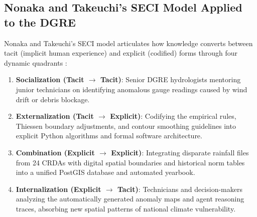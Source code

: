 \documentclass[12pt,a4paper]{report}
\begin{document}
\subsection{Nonaka and Takeuchi's SECI Model Applied to the DGRE}
Nonaka and Takeuchi's SECI model \cite{nonaka1995} articulates how knowledge converts between tacit (implicit human experience) and explicit (codified) forms through four dynamic quadrants \cite{nonaka1994}:
\begin{enumerate}
  \item \textbf{Socialization (Tacit $\rightarrow$ Tacit)}: Senior DGRE hydrologists mentoring junior technicians on identifying anomalous gauge readings caused by wind drift or debris blockage.
  \item \textbf{Externalization (Tacit $\rightarrow$ Explicit)}: Codifying the empirical rules, Thiessen boundary adjustments, and contour smoothing guidelines into explicit Python algorithms and formal software architecture.
  \item \textbf{Combination (Explicit $\rightarrow$ Explicit)}: Integrating disparate rainfall files from 24 CRDAs with digital spatial boundaries and historical norm tables into a unified PostGIS database and automated yearbook.
  \item \textbf{Internalization (Explicit $\rightarrow$ Tacit)}: Technicians and decision-makers analyzing the automatically generated anomaly maps and agent reasoning traces, absorbing new spatial patterns of national climate vulnerability.
\end{enumerate}
\end{document}
